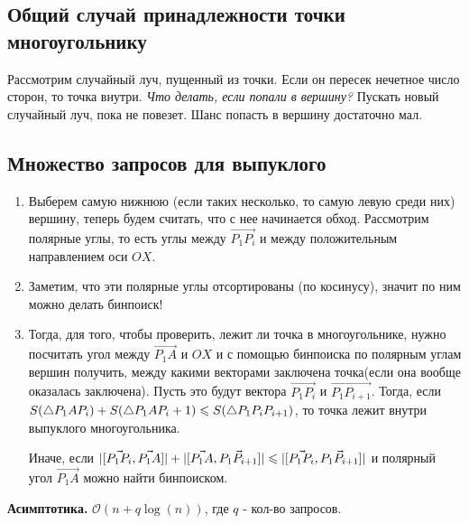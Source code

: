 \subsection*{Общий случай принадлежности точки многоугольнику}Рассмотрим случайный луч, пущенный из точки. Если он пересек нечетное число сторон, то точка внутри.\newline
\textit{Что делать, если попали в вершину?} Пускать новый случайный луч, пока не повезет. Шанс попасть в вершину достаточно мал.

\subsection*{Множество запросов для выпуклого}
\Alg 
\begin{enumerate}
    \item Выберем самую нижнюю (если таких несколько, то самую левую среди них) вершину, теперь будем считать, что с нее начинается обход. Рассмотрим полярные углы, то есть углы между $\Vec{P_1P_i}$ и между положительным направлением оси $OX$.
    \item Заметим, что эти полярные углы отсортированы (по косинусу), значит по ним можно делать бинпоиск!
    \item Тогда, для того, чтобы проверить, лежит ли точка в многоугольнике, нужно посчитать угол между $\Vec{P_1A}$ и $OX$ и с помощью бинпоиска по полярным углам вершин получить, между какими векторами заключена точка(если она вообще оказалась заключена). Пусть это будут вектора $\Vec{P_1P_i}$ и $\Vec{P_1P_{i+1}}$. Тогда, если $S(\triangle P_1AP_i)+ S(\triangle P_1AP_i+1) \leqslant S(\triangle P_1P_iP_{i+1})$, то точка лежит внутри выпуклого многоугольника.

    Иначе, если $|[\Vec{P_1P_{i}}, \Vec{P_1A}]| + |[\Vec{P_1A}, \Vec{P_1P_{i+1}}]| \leqslant |[\Vec{P_1P_{i}}, \Vec{P_1P_{i+1}}]|$ и полярный угол $\Vec{P_1A}$ можно найти бинпоиском.
\end{enumerate}

\textbf{Асимптотика.} $\mathcal{O}(n + q\log(n))$, где $q$ - кол-во запросов.
\pagebreak